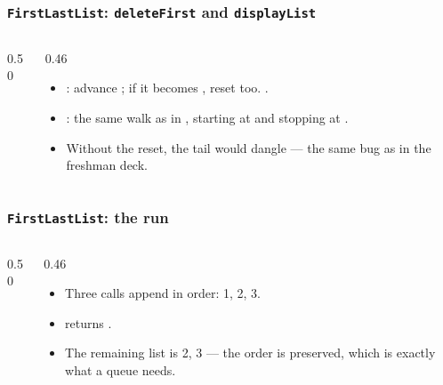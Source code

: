 \documentclass[aspectratio=169,10pt,compress]{beamer}
\begin{document}
\begin{frame}[t,fragile] \frametitle{\texttt{FirstLastList}: \texttt{deleteFirst} and \texttt{displayList}}
  \begin{columns}[T]
    \begin{column}{0.50\textwidth}
    \end{column}
    \begin{column}{0.46\textwidth}
      \begin{itemize}\small
        \item {}: advance ;
              if it becomes , reset  too.
              .
        \item {}: the same walk as in ,
              starting at  and stopping at .
        \item Without the  reset, the tail would
              dangle — the same bug as  in the freshman deck.
      \end{itemize}
    \end{column}
  \end{columns}
\end{frame}




\begin{frame}[t,fragile] \frametitle{\texttt{FirstLastList}: the run}
  \begin{columns}[T]
    \begin{column}{0.50\textwidth}
    \end{column}
    \begin{column}{0.46\textwidth}
      \small
      \begin{itemize}
        \item Three  calls append in order: 1, 2, 3.
        \item {} returns \hCode{[1, 1.0]}.
        \item The remaining list is 2, 3 — the order is preserved,
              which is exactly what a queue needs.
      \end{itemize}
    \end{column}
  \end{columns}
\end{frame}
\end{document}
